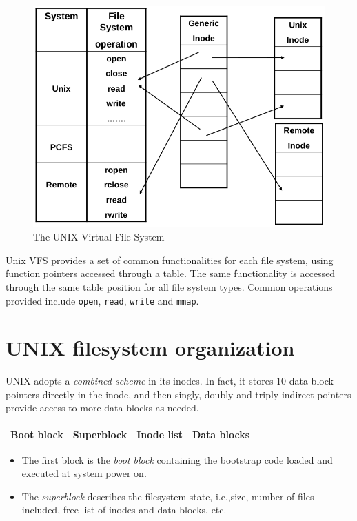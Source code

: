 \begin{figure}[hbtp]
\centering
\includegraphics[scale=0.35]{images/file_system/virtual_file_system.png}
\caption{The UNIX Virtual File System}
\end{figure}

Unix VFS provides a set of common functionalities for each file system, using function pointers
accessed through a table. The same functionality is accessed through the same table position for
all file system types. Common operations provided include \texttt{open}, \texttt{read}, \texttt{write} and \texttt{mmap}.

\section{UNIX filesystem organization}
UNIX adopts a \emph{combined scheme} in its inodes. In fact, it stores 10 data block pointers directly in the inode, and then singly, doubly and triply indirect pointers provide access to more data blocks as needed.

\begin{center}
\begin{tabular}{|c|c|c|c|}
\hline 
Boot block & Superblock & Inode list & Data blocks \\ 
\hline 
\end{tabular} 
\end{center}

\begin{itemize}
\item The first block is the \emph{boot block} containing the bootstrap code loaded and executed at system power on.
\item The \emph{superblock} describes the filesystem state, i.e.,\@ size, number of files included, free list of inodes and data blocks, etc.
\end{itemize}


